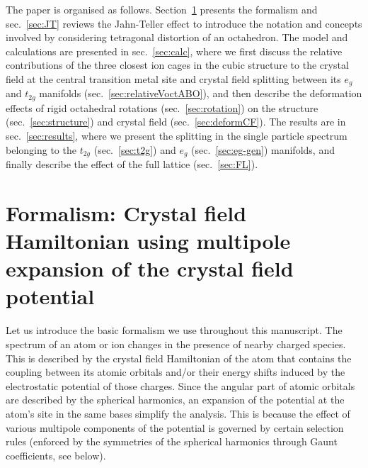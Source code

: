 \documentclass[a4paper,prb,twocolumn]{revtex4-1}  %
\newcommand{\az}[1]{{\color{magenta}{#1}}} %
\begin{document}
The paper is organised as follows.
Section~\ref{sec:formalistm}
presents the formalism and 
sec.~\ref{sec:JT} reviews the Jahn-Teller effect to
introduce the notation and concepts involved
by considering tetragonal distortion of an octahedron.
The model and calculations are presented
in sec.~\ref{sec:calc},
where
we first discuss the relative contributions of the three closest ion cages
in the cubic structure
 to
the crystal field at the central transition metal site 
and crystal field splitting between its $e_g$ and $t_{2g}$ manifolds
(sec.~\ref{sec:relativeVoctABO}),
and then 
describe the deformation effects of 
rigid octahedral rotations (sec.~\ref{sec:rotation})
on
the structure (sec.~\ref{sec:structure}) 
and crystal field (sec.~\ref{sec:deformCF}).
The results are in sec.~\ref{sec:results},
where we %
present the splitting in the single particle spectrum
belonging to the $t_{2g}$ (sec.~\ref{sec:t2g})
and $e_g$ (sec.~\ref{sec:eg-gen}) manifolds,
and finally describe the effect of the full lattice (sec.~\ref{sec:FL}).
\az{appendix?}







 
\section{Formalism: Crystal field Hamiltonian using multipole expansion of the crystal field potential}
\label{sec:formalistm}

Let us introduce the basic formalism we use throughout this manuscript.
The spectrum of an atom or ion
changes in the presence of nearby charged species.
This is described by the crystal field Hamiltonian of the atom
that contains the coupling between its atomic orbitals and/or their energy shifts
induced by the electrostatic potential of those charges.
Since the angular part of atomic orbitals are described by 
the spherical harmonics,
an expansion of the potential at the atom's site 
in the same bases simplify the analysis.
This is because
the effect of various multipole components of the potential
is governed by certain selection rules 
(enforced by the symmetries of the spherical harmonics
through Gaunt coefficients, see below).
\end{document}
